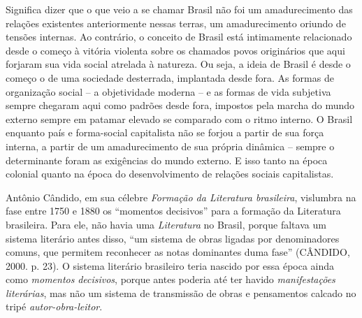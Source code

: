 Significa dizer que o que veio a se chamar Brasil não foi um
amadurecimento das relações existentes anteriormente nessas terras, um
amadurecimento oriundo de tensões internas. Ao contrário, o conceito de
Brasil está intimamente relacionado desde o começo à vitória violenta
sobre os chamados povos originários que aqui forjaram sua vida social
atrelada à natureza. Ou seja, a ideia de Brasil é desde o começo o de
uma sociedade desterrada, implantada desde fora. As formas de
organização social -- a objetividade moderna -- e as formas de vida
subjetiva sempre chegaram aqui como padrões desde fora, impostos pela
marcha do mundo externo sempre em patamar elevado se comparado com o
ritmo interno. O Brasil enquanto país e forma-social capitalista não se
forjou a partir de sua força interna, a partir de um amadurecimento de
sua própria dinâmica -- sempre o determinante foram as exigências do
mundo externo. E isso tanto na época colonial quanto na época do
desenvolvimento de relações sociais capitalistas.

Antônio Cândido, em sua célebre \emph{Formação da Literatura
brasileira}, vislumbra na fase entre 1750 e 1880 os ``momentos
decisivos'' para a formação da Literatura brasileira. Para ele, não
havia uma \emph{Literatura} no Brasil, porque faltava um sistema
literário antes disso, ``um sistema de obras ligadas por denominadores
comuns, que permitem reconhecer as notas dominantes duma fase''
(CÂNDIDO, 2000. p. 23). O sistema literário brasileiro teria nascido por
essa época ainda como \emph{momentos} \emph{decisivos}, porque antes
poderia até ter havido \emph{manifestações literárias}, mas não um
sistema de transmissão de obras e pensamentos calcado no tripé
\emph{autor-obra-leitor}.

